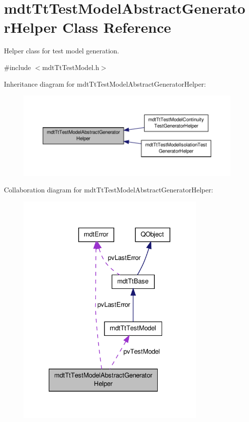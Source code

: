 \hypertarget{classmdt_tt_test_model_abstract_generator_helper}{\section{mdt\-Tt\-Test\-Model\-Abstract\-Generator\-Helper Class Reference}
\label{classmdt_tt_test_model_abstract_generator_helper}
}


Helper class for test model generation.  




{\ttfamily \#include $<$mdt\-Tt\-Test\-Model.\-h$>$}



Inheritance diagram for mdt\-Tt\-Test\-Model\-Abstract\-Generator\-Helper\-:
\nopagebreak
\begin{figure}[H]
\begin{center}
\leavevmode
\includegraphics[width=350pt]{classmdt_tt_test_model_abstract_generator_helper__inherit__graph}
\end{center}
\end{figure}


Collaboration diagram for mdt\-Tt\-Test\-Model\-Abstract\-Generator\-Helper\-:
\nopagebreak
\begin{figure}[H]
\begin{center}
\leavevmode
\includegraphics[width=265pt]{classmdt_tt_test_model_abstract_generator_helper__coll__graph}
\end{center}
\end{figure}

